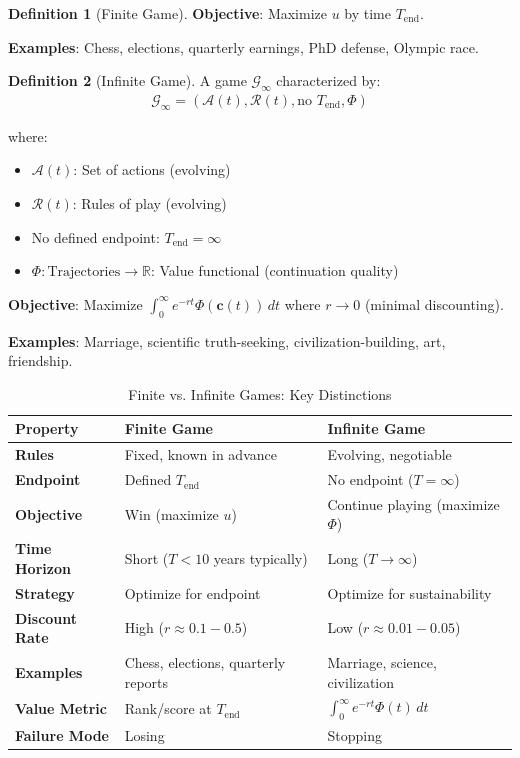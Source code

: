 \documentclass[11pt,a4paper]{article}
\theoremstyle{definition}
\newtheorem{definition}{Definition}[section]
\theoremstyle{remark}
\newcommand{\RR}{\mathbb{R}}
\newcommand{\cc}{\mathbf{c}}
\begin{document}
\begin{enumerate}
\begin{definition}[Finite Game]
\textbf{Objective}: Maximize \(u\) by time \(T_{\text{end}}\).

\textbf{Examples}: Chess, elections, quarterly earnings, PhD defense, Olympic race.
\end{definition}

\begin{definition}[Infinite Game]
A game \(\mathcal{G}_\infty\) characterized by:
\begin{align}
\mathcal{G}_\infty = (\mathcal{A}(t), \mathcal{R}(t), \text{no } T_{\text{end}}, \Phi)
\end{align}

where:
\begin{itemize}
    \item \(\mathcal{A}(t)\): Set of actions (evolving)
    \item \(\mathcal{R}(t)\): Rules of play (evolving)
    \item No defined endpoint: \(T_{\text{end}} = \infty\)
    \item \(\Phi: \text{Trajectories} \to \RR\): Value functional (continuation quality)
\end{itemize}

\textbf{Objective}: Maximize \(\int_0^\infty e^{-rt} \Phi(\cc(t)) \, dt\) where \(r \to 0\) (minimal discounting).

\textbf{Examples}: Marriage, scientific truth-seeking, civilization-building, art, friendship.
\end{definition}

\begin{table}[H]
\centering
\caption{Finite vs. Infinite Games: Key Distinctions}
\label{tab:games_comparison}
\begin{tabular}{|p{3cm}|p{5.5cm}|p{5.5cm}|}
\hline
\textbf{Property} & \textbf{Finite Game} & \textbf{Infinite Game} \\
\hline
\textbf{Rules} & Fixed, known in advance & Evolving, negotiable \\
\hline
\textbf{Endpoint} & Defined \(T_{\text{end}}\) & No endpoint (\(T = \infty\)) \\
\hline
\textbf{Objective} & Win (maximize \(u\)) & Continue playing (maximize \(\Phi\)) \\
\hline
\textbf{Time Horizon} & Short (\(T < 10\) years typically) & Long (\(T \to \infty\)) \\
\hline
\textbf{Strategy} & Optimize for endpoint & Optimize for sustainability \\
\hline
\textbf{Discount Rate} & High (\(r \approx 0.1-0.5\)) & Low (\(r \approx 0.01-0.05\)) \\
\hline
\textbf{Examples} & Chess, elections, quarterly reports & Marriage, science, civilization \\
\hline
\textbf{Value Metric} & Rank/score at \(T_{\text{end}}\) & \(\int_0^\infty e^{-rt} \Phi(t) \, dt\) \\
\hline
\textbf{Failure Mode} & Losing & Stopping \\
\hline
\end{tabular}
\end{table}


\end{enumerate}
\end{document}
